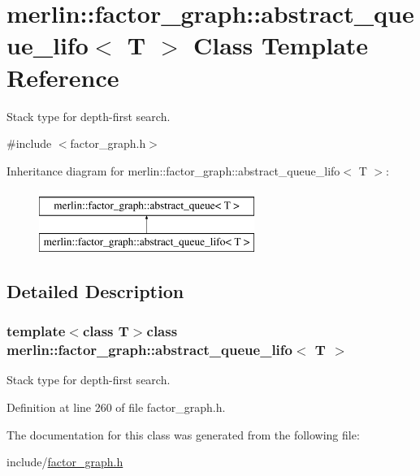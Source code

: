 \hypertarget{classmerlin_1_1factor__graph_1_1abstract__queue__lifo}{}\section{merlin\+:\+:factor\+\_\+graph\+:\+:abstract\+\_\+queue\+\_\+lifo$<$ T $>$ Class Template Reference}
\label{classmerlin_1_1factor__graph_1_1abstract__queue__lifo}


Stack type for depth-\/first search.  




{\ttfamily \#include $<$factor\+\_\+graph.\+h$>$}

Inheritance diagram for merlin\+:\+:factor\+\_\+graph\+:\+:abstract\+\_\+queue\+\_\+lifo$<$ T $>$\+:\begin{figure}[H]
\begin{center}
\leavevmode
\includegraphics[height=2.000000cm]{classmerlin_1_1factor__graph_1_1abstract__queue__lifo}
\end{center}
\end{figure}


\subsection{Detailed Description}
\subsubsection*{template$<$class T$>$class merlin\+::factor\+\_\+graph\+::abstract\+\_\+queue\+\_\+lifo$<$ T $>$}

Stack type for depth-\/first search. 

Definition at line 260 of file factor\+\_\+graph.\+h.



The documentation for this class was generated from the following file\+:\begin{DoxyCompactItemize}
\item 
include/\hyperlink{factor__graph_8h}{factor\+\_\+graph.\+h}\end{DoxyCompactItemize}
